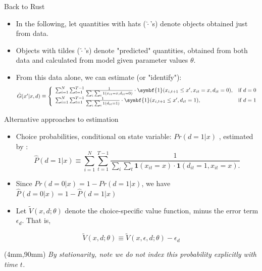 \documentclass[aspectratio=169,11pt]{beamer}
\newenvironment{reference}[2]{%
  \begin{textblock*}{\textwidth}(#1,#2) 
      \footnotesize\it\bgroup\color{red!50!black}}{\egroup\end{textblock*}}
\begin{document}
\begin{frame}{Back to Rust}
\begin{itemize}
\item In the following, let quantities with hats ($\hat \cdot$'s) denote objects obtained just from data.
\item Objects with tildes ($\tilde \cdot $'s) denote "predicted" quantities, obtained from both data and calculated from model given parameter values $\theta$. 
\item  From this data alone, we can estimate (or "identify"):
\begin{equation*}
\resizebox{.9999999\hsize}{!}{$ \hat G (x' | x, d) \equiv \left \{
\begin{array}{lc} 
\sum^N_{i=1} \sum^{T-1}_{t=1} \frac{1}{\sum_i \sum_t 1 (x_{it} = x, d_{it} = 0)} \cdot \symbf{1} (x_{i, t+1} \leq x', x_{it} = x, d_{it} = 0), & \text{if } d = 0 \\
\sum^N_{i=1} \sum^{T-1}_{t=1} \frac{1}{\sum_i \sum_t 1 (d_{it}=1)} \cdot \symbf{1} (x_{i,t+1} \leq x', d_{it} = 1), & \text{if } d =1
\end{array}
\right . $}
\end{equation*}
\end{itemize}
\end{frame}

\begin{frame}{Alternative approaches to estimation}
\begin{itemize}
\item Choice probabilities, conditional on state variable: $Pr(d = 1 | x)$  , estimated by :
\begin{equation*}
\hat P (d = 1| x) \equiv \sum^N_{i=1} \sum^{T-1}_{t=1} \frac{1}{\sum_i \sum_t \symbf{1} (x_{it} = x ) \cdot \symbf{1} (d_{it} =1, x_{it} = x).}
\end{equation*}
\item  Since  $Pr(d = 0 | x) = 1 - Pr(d=1 |x)$, we have $\hat{P} (d = 0 | x) = 1 - \hat{P}(d = 1|x)$
\item Let $\tilde V (x, d ; \theta)$ denote the choice-specific value function, minus the error term $\epsilon_d$. That is,
\end{itemize}
\begin{equation*}
\tilde V (x, d; \theta) \equiv \tilde V (x, \epsilon, d; \theta) - \epsilon_d
\end{equation*}
\begin{reference}{4mm}{90mm}
By stationarity, note we do not index this probability explicitly with time $t$.
\end{reference}
\end{frame}
\end{document}
